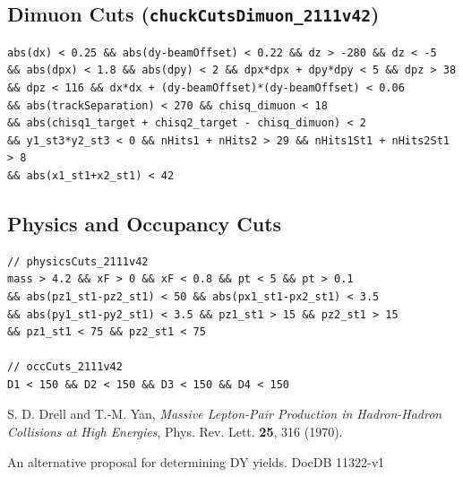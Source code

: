 \documentclass[11pt]{article}
\begin{document}
\subsection{Dimuon Cuts (\texttt{chuckCutsDimuon\_2111v42})}
\label{cut:chuck_dimuon}
{\small\begin{verbatim}
abs(dx) < 0.25 && abs(dy-beamOffset) < 0.22 && dz > -280 && dz < -5
&& abs(dpx) < 1.8 && abs(dpy) < 2 && dpx*dpx + dpy*dpy < 5 && dpz > 38
&& dpz < 116 && dx*dx + (dy-beamOffset)*(dy-beamOffset) < 0.06
&& abs(trackSeparation) < 270 && chisq_dimuon < 18
&& abs(chisq1_target + chisq2_target - chisq_dimuon) < 2
&& y1_st3*y2_st3 < 0 && nHits1 + nHits2 > 29 && nHits1St1 + nHits2St1 > 8
&& abs(x1_st1+x2_st1) < 42
\end{verbatim}}

\subsection{Physics and Occupancy Cuts}
\label{cut:physics_occ}
{\small\begin{verbatim}
// physicsCuts_2111v42
mass > 4.2 && xF > 0 && xF < 0.8 && pt < 5 && pt > 0.1
&& abs(pz1_st1-pz2_st1) < 50 && abs(px1_st1-px2_st1) < 3.5
&& abs(py1_st1-py2_st1) < 3.5 && pz1_st1 > 15 && pz2_st1 > 15
&& pz1_st1 < 75 && pz2_st1 < 75

// occCuts_2111v42
D1 < 150 && D2 < 150 && D3 < 150 && D4 < 150
\end{verbatim}}


\clearpage
\begin{thebibliography}{99}
    S. D. Drell and T.-M. Yan,
    \textit{Massive Lepton-Pair Production in Hadron-Hadron Collisions at High Energies},
    Phys. Rev. Lett. \textbf{25}, 316 (1970).
    
    An alternative proposal for determining DY yields. DocDB 11322-v1
    
\end{thebibliography}
\end{document}
